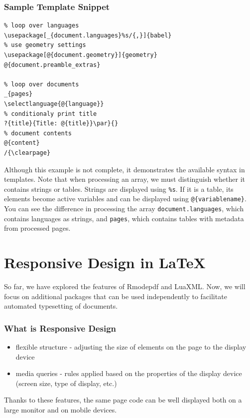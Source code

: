 \begin{frame}[fragile]
  \frametitle{Sample Template Snippet}
\begin{verbatim}
% loop over languages
\usepackage[_{document.languages}%s/{,}]{babel}
% use geometry settings
\usepackage[@{document.geometry}]{geometry}
@{document.preamble_extras}

% loop over documents
_{pages}
\selectlanguage{@{language}}
% conditionaly print title
?{title}{Title: @{title}}\par}{}
% document contents
@{content}
/{\clearpage}

\end{verbatim}
\end{frame}

Although this example is not complete, it demonstrates the available syntax in templates.
Note that when processing an array, we must distinguish whether it contains
strings or tables. Strings are displayed using \verb|%s|. If it is a table, its
elements become active variables and can be displayed using
\verb|@{variablename}|. You can see the difference in processing the array
\verb|document.languages|, which contains languages as strings, and
\verb|pages|, which contains tables with metadata from processed pages.



\section{Responsive Design in \LaTeX}


So far, we have explored the features of Rmodepdf and LuaXML. Now, we will
focus on additional packages that can be used independently to facilitate
automated typesetting of documents.

\ifdefined\HCode
  \long{}
\fi


\begin{frame}
   \frametitle{What is Responsive Design}
   \begin{itemize}
     \item flexible structure - adjusting the size of elements on the page to the display device
     \item media queries - rules applied based on the properties of the display device (screen size, type of display, etc.)
   \end{itemize}

   Thanks to these features, the same page code can be well displayed both on a large monitor and on mobile devices.
\end{frame}

